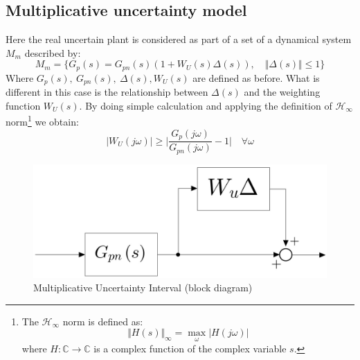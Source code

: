 \documentclass[a4paper, 12pt]{article}
\begin{document}
    \subsection{Multiplicative uncertainty model}
    Here the real uncertain plant is considered as part of a set of a dynamical system $M_m$ described by: 
    \begin{equation}
        M_m = \{
            G_p(s) = G_{pn}(s) (1 + W_U(s) \Delta(s)), \quad 
            \Vert \Delta(s) \Vert \le 1
        \}
    \end{equation}
    Where $G_p(s), \ G_{pn}(s), \ \Delta(s), W_U(s)$ are defined as before. What is different in this case is the relationship between $\Delta(s)$ and the weighting function $W_U(s)$. By doing simple calculation and applying the definition of $\mathcal{H}_\infty$ norm\footnote{
        The $\mathcal{H}_\infty$ norm is defined as:
        \begin{equation*}
            \Vert H(s) \Vert_\infty 
        = \max_{\omega} \vert H(j\omega) \vert
        \end{equation*}
        where $H: \mathbb{C} \to \mathbb{C}$ is a complex function of the complex variable $s$.
    } we obtain:
    \begin{equation} \label{eq:cloud_m}
        \vert W_U(j\omega) \vert \ge
        \bigg\vert
            \frac{G_p(j\omega)}{G_{pn}(j\omega)}-1
        \bigg\vert \quad \forall \omega
    \end{equation}
    
    \begin{figure}[h]
        \centering
        \includegraphics[scale=0.2]{img/Multiplicative.jpeg}
        \caption{Multiplicative Uncertainty Interval (block diagram)}
    \end{figure}

    \newpage
\end{document}
